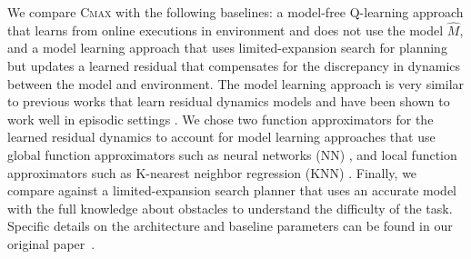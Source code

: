 We compare \textsc{Cmax} with
the following baselines: a
model-free Q-learning approach
\cite{DBLP:journals/nature/MnihKSRVBGRFOPB15} that learns from
online executions in environment
and does not use the model $\hat{M}$, and a model learning approach that uses
limited-expansion search for planning but updates a learned residual that
compensates for the discrepancy in dynamics between the model and
environment. The model learning approach is very similar to previous works
that learn residual dynamics models and have been shown to work well in
episodic settings \cite{rastogi2018sample, DBLP:conf/icra/HaY15,
  DBLP:conf/iros/SaverianoYFL17}. We chose two function
approximators for the learned residual dynamics to account for
model learning approaches that use global function
approximators such as neural networks (NN)
\cite{DBLP:conf/nips/JannerFZL19}, and local function approximators
such as K-nearest neighbor regression (KNN)
\cite{DBLP:conf/nips/NouriL08, DBLP:conf/atal/JongS07}. Finally, we compare against
a limited-expansion search planner that uses an accurate model with
the full knowledge about
obstacles to understand the
difficulty of the task. Specific details on the architecture and baseline
parameters can be found in our original paper~\cite{cmax}.

